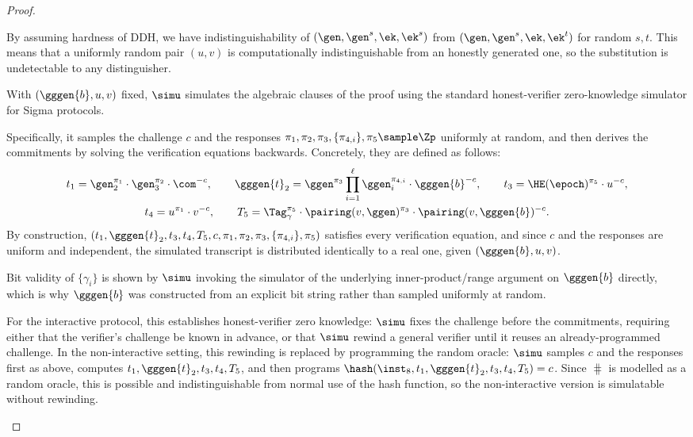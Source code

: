 \begin{proof}
\begin{description}
      By assuming hardness of DDH, we have indistinguishability of $(\gen,
      \gen^s, \ek, \ek^s)$ from $(\gen, \gen^s, \ek, \ek^t)$ for random $s,t$.
      This means that a uniformly random pair $(u,v)$ is computationally
      indistinguishable from an honestly generated one, so the substitution is
      undetectable to any distinguisher.

    \item[Simulating the Sigma protocol.] With $(\gggen{b}, u, v)$ fixed,
      $\simu$ simulates the algebraic clauses of the proof using the standard
      honest-verifier zero-knowledge simulator for Sigma protocols.

      Specifically, it samples the challenge $c$ and the responses $\pi_1,
      \pi_2, \pi_3, \{\pi_{4,i}\}, \pi_5 \sample \Zp$ uniformly at random, and
      then derives the commitments by solving the verification equations
      backwards. Concretely, they are defined as follows:
      \begin{gather*}
        t_1 = \gen_2^{\pi_1}\cdot \gen_3^{\pi_2}\cdot\com^{-c}, \qquad
        \gggen{t}_2 = \ggen^{\pi_3}\prod_{i=1}^{\ell}
        \ggen_i^{\pi_{4,i}}\cdot\gggen{b}^{-c}, \qquad t_3 =
        \HE(\epoch)^{\pi_5}\cdot u^{-c}, \\
        t_4 = u^{\pi_1}\cdot v^{-c}, \qquad T_5 = \Tag_\gamma^{\pi_5} \cdot
        \pairing(v, \ggen)^{\pi_3}\cdot \pairing(v,\gggen{b})^{-c}.
      \end{gather*}
      By construction,
      $(t_1,\gggen{t}_2,t_3,t_4,T_5,c,\pi_1,\pi_2,\pi_3,\{\pi_{4,i}\},\pi_5)$
      satisfies every verification equation, and since $c$ and the responses
      are uniform and independent, the simulated transcript is distributed
      identically to a real one, given $(\gggen{b}, u, v)$.

      Bit validity of $\{\gamma_i\}$ is shown by $\simu$ invoking the simulator
      of the underlying inner-product/range argument on $\gggen{b}$ directly,
      which is why $\gggen{b}$ was constructed from an explicit bit string
      rather than sampled uniformly at random.

      For the interactive protocol, this establishes honest-verifier zero
      knowledge: $\simu$ fixes the challenge before the commitments, requiring
      either that the verifier's challenge be known in advance, or that $\simu$
      rewind a general verifier until it reuses an already-programmed
      challenge. In the non-interactive setting, this rewinding is replaced by
      programming the random oracle: $\simu$ samples $c$ and the responses
      first as above, computes $t_1,\gggen{t}_2,t_3,t_4,T_5$, and then programs
      $\hash(\inst_8, t_1,\gggen{t}_2,t_3,t_4,T_5) = c$. Since $\hash$ is
      modelled as a random oracle, this is possible and indistinguishable from
      normal use of the hash function, so the non-interactive version is
      simulatable without rewinding.


\end{description}
\end{proof}
